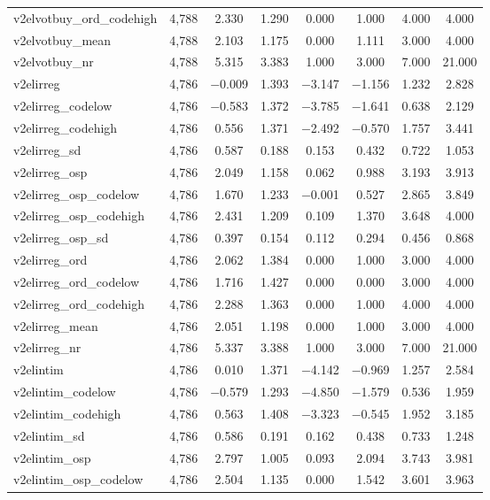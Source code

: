 \begin{table}[!htbp]
\begin{tabular}{@{\extracolsep{5pt}}lccccccc}
v2elvotbuy\_ord\_codehigh & 4,788 & 2.330 & 1.290 & 0.000 & 1.000 & 4.000 & 4.000 \\ 
v2elvotbuy\_mean & 4,788 & 2.103 & 1.175 & 0.000 & 1.111 & 3.000 & 4.000 \\ 
v2elvotbuy\_nr & 4,788 & 5.315 & 3.383 & 1.000 & 3.000 & 7.000 & 21.000 \\ 
v2elirreg & 4,786 & $-$0.009 & 1.393 & $-$3.147 & $-$1.156 & 1.232 & 2.828 \\ 
v2elirreg\_codelow & 4,786 & $-$0.583 & 1.372 & $-$3.785 & $-$1.641 & 0.638 & 2.129 \\ 
v2elirreg\_codehigh & 4,786 & 0.556 & 1.371 & $-$2.492 & $-$0.570 & 1.757 & 3.441 \\ 
v2elirreg\_sd & 4,786 & 0.587 & 0.188 & 0.153 & 0.432 & 0.722 & 1.053 \\ 
v2elirreg\_osp & 4,786 & 2.049 & 1.158 & 0.062 & 0.988 & 3.193 & 3.913 \\ 
v2elirreg\_osp\_codelow & 4,786 & 1.670 & 1.233 & $-$0.001 & 0.527 & 2.865 & 3.849 \\ 
v2elirreg\_osp\_codehigh & 4,786 & 2.431 & 1.209 & 0.109 & 1.370 & 3.648 & 4.000 \\ 
v2elirreg\_osp\_sd & 4,786 & 0.397 & 0.154 & 0.112 & 0.294 & 0.456 & 0.868 \\ 
v2elirreg\_ord & 4,786 & 2.062 & 1.384 & 0.000 & 1.000 & 3.000 & 4.000 \\ 
v2elirreg\_ord\_codelow & 4,786 & 1.716 & 1.427 & 0.000 & 0.000 & 3.000 & 4.000 \\ 
v2elirreg\_ord\_codehigh & 4,786 & 2.288 & 1.363 & 0.000 & 1.000 & 4.000 & 4.000 \\ 
v2elirreg\_mean & 4,786 & 2.051 & 1.198 & 0.000 & 1.000 & 3.000 & 4.000 \\ 
v2elirreg\_nr & 4,786 & 5.337 & 3.388 & 1.000 & 3.000 & 7.000 & 21.000 \\ 
v2elintim & 4,786 & 0.010 & 1.371 & $-$4.142 & $-$0.969 & 1.257 & 2.584 \\ 
v2elintim\_codelow & 4,786 & $-$0.579 & 1.293 & $-$4.850 & $-$1.579 & 0.536 & 1.959 \\ 
v2elintim\_codehigh & 4,786 & 0.563 & 1.408 & $-$3.323 & $-$0.545 & 1.952 & 3.185 \\ 
v2elintim\_sd & 4,786 & 0.586 & 0.191 & 0.162 & 0.438 & 0.733 & 1.248 \\ 
v2elintim\_osp & 4,786 & 2.797 & 1.005 & 0.093 & 2.094 & 3.743 & 3.981 \\ 
v2elintim\_osp\_codelow & 4,786 & 2.504 & 1.135 & 0.000 & 1.542 & 3.601 & 3.963 \\ 

\end{tabular}
\end{table}
